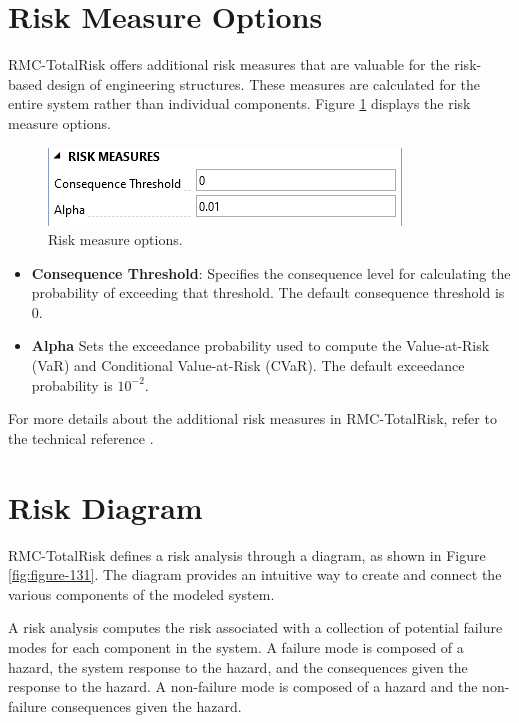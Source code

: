 \documentclass[
]{book}
\begin{document}
\hypertarget{risk-measure-options}{%
\section{Risk Measure Options}\label{risk-measure-options}}

RMC-TotalRisk offers additional risk measures that are valuable for the risk-based design of engineering structures. These measures are calculated for the entire system rather than individual components. Figure \ref{fig:figure-130} displays the risk measure options.

\begin{figure}

{\centering \includegraphics{images/figure130} 

}

\caption{Risk measure options.}\label{fig:figure-130}
\end{figure}

\begin{itemize}
\item
  \textbf{Consequence Threshold}: Specifies the consequence level for calculating the probability of exceeding that threshold. The default consequence threshold is \(0\).
\item
  \textbf{Alpha} Sets the exceedance probability used to compute the Value-at-Risk (VaR) and Conditional Value-at-Risk (CVaR). The default exceedance probability is \(10^{−2}\).
\end{itemize}

For more details about the additional risk measures in RMC-TotalRisk, refer to the technical reference \citep{cite-TechRef}.

\hypertarget{risk-diagram}{%
\section{Risk Diagram}\label{risk-diagram}}

RMC-TotalRisk defines a risk analysis through a diagram, as shown in Figure \ref{fig:figure-131}. The diagram provides an intuitive way to create and connect the various components of the modeled system.

A risk analysis computes the risk associated with a collection of potential failure modes for each component in the system. A failure mode is composed of a hazard, the system response to the hazard, and the consequences given the response to the hazard. A non-failure mode is composed of a hazard and the non-failure consequences given the hazard.
\end{document}
